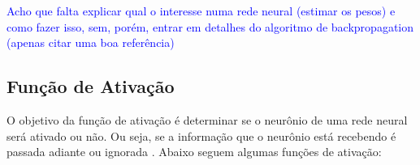 \documentclass{automatextcc}
\newcommand{\pumi}[1]{\textcolor{blue}{#1}}
\begin{document}


\pumi{Acho que falta explicar qual o interesse numa rede neural (estimar os pesos) e como fazer isso, sem, porém, entrar em detalhes do algoritmo de backpropagation (apenas citar uma boa referência)}
\subsection{Função de Ativação}
O objetivo da função de ativação é determinar se o neurônio de uma rede neural será ativado ou não. Ou seja, se a informação que o neurônio está recebendo é passada adiante ou ignorada \citep{dsa2021deeplearningbook}. Abaixo seguem algumas funções de ativação:
\end{document}
